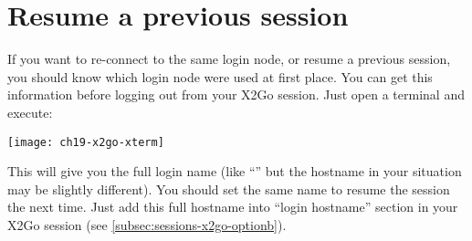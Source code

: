 \section{Resume a previous session}
\label{sec:re-connect-x2go}

If you want to re-connect to the same login node, or resume a previous session, you should know which login node were used at first place.
You can get this information before logging out from your X2Go session. Just open a terminal and execute: 

\begin{prompt}
\end{prompt}

\texttt{[image: ch19-x2go-xterm]}

This will give you the full login name (like ``\strong{\emph{\loginhost{}}}'' but the hostname in your situation may be slightly different).
You should set the same name to resume the  session the next time.
Just add this full hostname into ``login hostname'' section in your X2Go session (see \autoref{subsec:sessions-x2go-optionb}).
